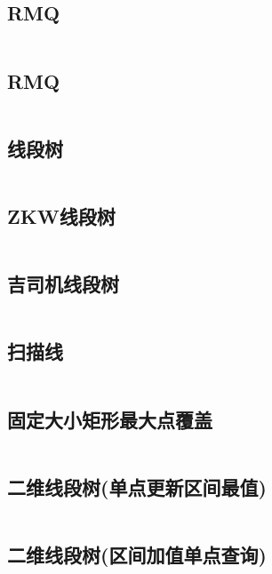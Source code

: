 \inputminted{cpp}{code/Heap.cc}

\subsection{RMQ} 

\inputminted{cpp}{code/RMQ.cc}

\subsection{RMQ} 

\inputminted{cpp}{code/RMQ2.cc}

\subsection{线段树} 

\inputminted{cpp}{code/segmentTree.cc}

\subsection{ZKW线段树} 

\inputminted{cpp}{code/ZKW线段树.cc}

\subsection{吉司机线段树} 

\inputminted{cpp}{code/SegmentTreeBeats.cc}

\subsection{扫描线} 

\inputminted{cpp}{code/scanningLine.cc}

\subsection{固定大小矩形最大点覆盖} 

\inputminted{cpp}{code/linescanMaxSquareCover.cc}

\subsection{二维线段树(单点更新区间最值)} 

\inputminted{cpp}{code/2dsegtree1.cc}

\subsection{二维线段树(区间加值单点查询)} 

